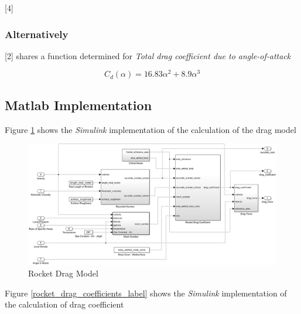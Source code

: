 \documentclass[]{article}
\begin{document}
{[}4{]}

\subsubsection{Alternatively}\label{alternatively}

{[}2{]} shares a function determined for \emph{Total drag coefficient
due to angle-of-attack}

\begin{equation}
\label{eq_darg_total_aoa}
C_d (\alpha) = 16.83 \alpha^2 + 8.9 \alpha^3
\end{equation}

\subsection{Matlab Implementation}\label{matlab-implementation}

Figure \ref{rocket_drag_model_label} shows the \emph{Simulink}
implementation of the calculation of the drag model

\begin{figure}[htbp]
\centering
\includegraphics{images/rocket_drag_model.png}
\caption{Rocket Drag Model\label{rocket_drag_model_label}}
\end{figure}

\clearpage

Figure \ref{rocket_drag_coefficients_label} shows the \emph{Simulink}
implementation of the calculation of drag coefficient
\end{document}

